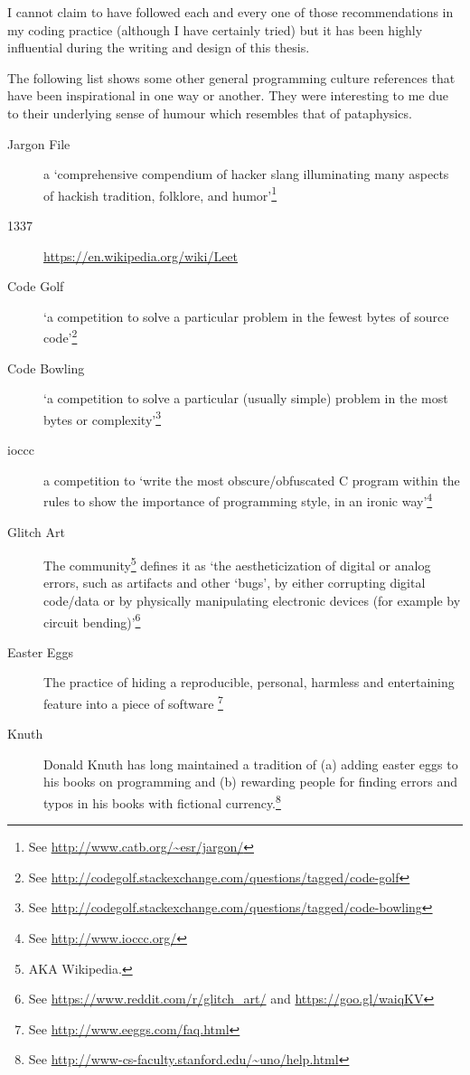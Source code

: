 I cannot claim to have followed each and every one of those recommendations in my coding practice (although I have certainly tried) but it has been highly influential during the writing and design of this thesis.

\spirals

The following list shows some other general programming culture references that have been inspirational in one way or another. They were interesting to me due to their underlying sense of humour which resembles that of pataphysics.

\begin{description}
  \item [Jargon File] a `comprehensive compendium of hacker slang illuminating many aspects of hackish tradition, folklore, and humor'\footnote{See \url{http://www.catb.org/~esr/jargon/}}
  \item [1337] \url{https://en.wikipedia.org/wiki/Leet}
  \item [Code Golf] `a competition to solve a particular problem in the fewest bytes of source code'\footnote{See \url{http://codegolf.stackexchange.com/questions/tagged/code-golf}}
  \item [Code Bowling] `a competition to solve a particular (usually simple) problem in the most bytes or complexity'\footnote{See \url{http://codegolf.stackexchange.com/questions/tagged/code-bowling}}
  \item [\gls{ioccc}] a competition to `write the most obscure/obfuscated C program within the rules to show the importance of programming style, in an ironic way'\footnote{See \url{http://www.ioccc.org/}}
  \item [Glitch Art] The community\footnote{AKA Wikipedia.} defines it as `the aestheticization of digital or analog errors, such as artifacts and other `bugs', by either corrupting digital code/data or by physically manipulating electronic devices (for example by circuit bending)'\footnote{See \url{https://www.reddit.com/r/glitch_art/} and \url{https://goo.gl/waiqKV}}
  \item [Easter Eggs] The practice of hiding a reproducible, personal, harmless and entertaining feature into a piece of software \footnote{See \url{http://www.eeggs.com/faq.html}}
  \item [Knuth] Donald Knuth has long maintained a tradition of (a) adding easter eggs to his books on programming and (b) rewarding people for finding errors and typos in his books with fictional currency.\footnote{See \url{http://www-cs-faculty.stanford.edu/~uno/help.html}}
\end{description}

